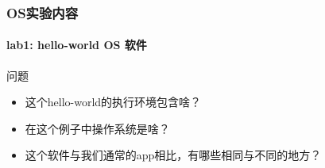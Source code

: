 
\begin{frame}
    \frametitle{OS实验内容}
    \framesubtitle{lab1: hello-world OS  软件}
    问题
        \begin{itemize}
            \item 这个hello-world的执行环境包含啥？
            \item 在这个例子中操作系统是啥？
            \item 这个软件与我们通常的app相比，有哪些相同与不同的地方？
        \end{itemize}
     

\end{frame}

